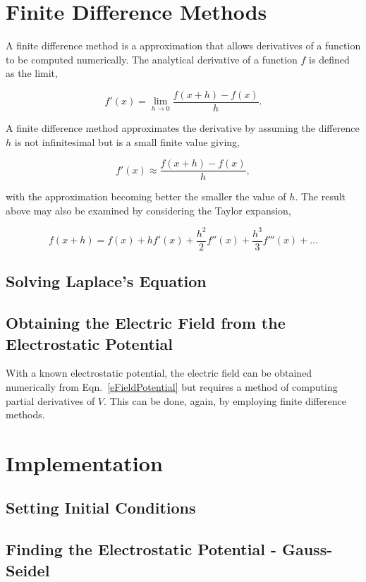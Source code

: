 \documentclass{article}
\begin{document}
\section{Finite Difference Methods}

A finite difference method is a approximation that allows derivatives of a function to be computed numerically. The analytical derivative of a function $f$ is defined as the limit,

$$
f'(x) = \lim_{h \to 0} \frac{f(x+h)-f(x)}{h}.
$$

A finite difference method approximates the derivative by assuming the difference $h$ is not infinitesimal but is a small finite value giving,

$$
f'(x) \approx \frac{f(x+h)-f(x)}{h},
$$

with the approximation becoming better the smaller the value of $h$. The result above may also be examined by considering the Taylor expansion,

$$
f(x+h) = f(x) + hf'(x) + \frac{h^2}{2}f''(x) + \frac{h^3}{3}f'''(x) + \ldots 
$$


\subsection{Solving Laplace's Equation}



\subsection{Obtaining the Electric Field from the Electrostatic Potential}

With a known electrostatic potential, the electric field can be obtained numerically from Eqn.~\ref{eFieldPotential} but requires a method of computing partial derivatives of $V$. This can be done, again, by employing finite difference methods.



\section{Implementation}

\subsection{Setting Initial Conditions}




\subsection{Finding the Electrostatic Potential - Gauss-Seidel}
\end{document}
